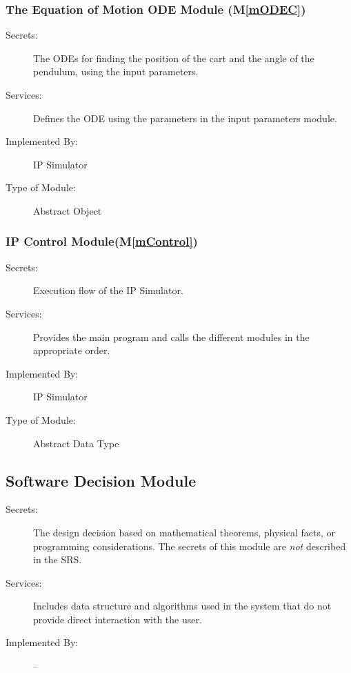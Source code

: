 \documentclass[12pt, titlepage]{article}
\newcommand{\mref}[1]{M\ref{#1}}
\begin{document}
\subsubsection{The Equation of Motion ODE Module (\mref{mODEC})}

\begin{description}
\item[Secrets:] The ODEs for finding the position of the cart and  the angle of the pendulum, using the input parameters.
\item[Services:] Defines the ODE using the parameters in the input parameters module.

\item[Implemented By:] IP Simulator
\item[Type of Module:] Abstract Object
\end{description} 


\subsubsection{IP Control Module(\mref{mControl})}

\begin{description}
\item[Secrets:] Execution flow of the IP Simulator. 
\item[Services:] Provides the main program and calls the different modules in the appropriate order.
\item[Implemented By:] IP Simulator
\item[Type of Module:] Abstract Data Type
\end{description} 


\subsection{Software Decision Module}

\begin{description}
\item[Secrets:] The design decision based on mathematical theorems, physical facts, or programming considerations. The secrets of this module are \emph{not} described in the SRS.
\item[Services:] Includes data structure and algorithms used in the system that do not provide direct interaction with the user. 
\item[Implemented By:] --
\end{description}
\end{document}
